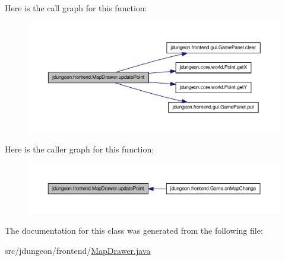 Here is the call graph for this function:
\nopagebreak
\begin{figure}[H]
\begin{center}
\leavevmode
\includegraphics[width=400pt]{classjdungeon_1_1frontend_1_1_map_drawer_a08d05d657a30325523dedf9ce70a73f3_cgraph}
\end{center}
\end{figure}




Here is the caller graph for this function:
\nopagebreak
\begin{figure}[H]
\begin{center}
\leavevmode
\includegraphics[width=400pt]{classjdungeon_1_1frontend_1_1_map_drawer_a08d05d657a30325523dedf9ce70a73f3_icgraph}
\end{center}
\end{figure}




The documentation for this class was generated from the following file:\begin{DoxyCompactItemize}
\item 
src/jdungeon/frontend/\hyperlink{_map_drawer_8java}{MapDrawer.java}\end{DoxyCompactItemize}
